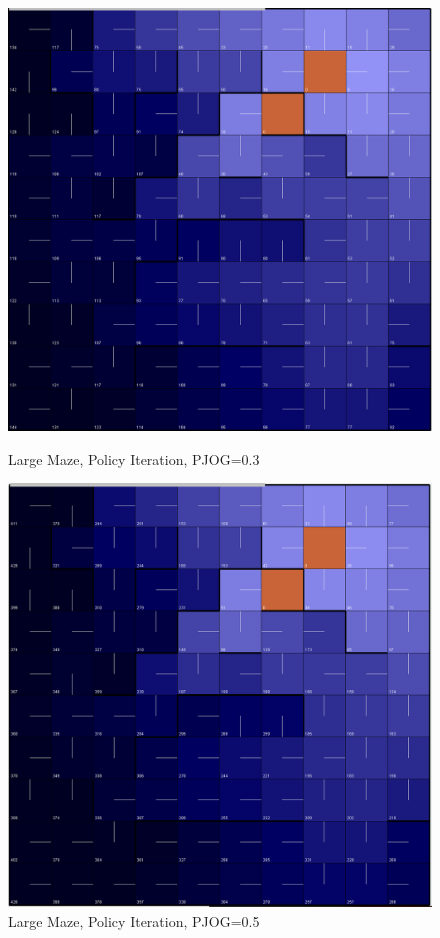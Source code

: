 \documentclass[11pt]{article}
\begin{document}
\begin{figure}[!htb]
   \begin{minipage}{0.4\textwidth}
     \centering
     \includegraphics[width=1.2\linewidth]{../figures/policy2_3.png}
     \caption{Large Maze, Policy Iteration, PJOG=0.3}\label{Fig:policy2_3}
   \end{minipage}\hfill
   \begin{minipage}{0.4\textwidth}
     \centering
     \includegraphics[width=1.2\linewidth]{../figures/policy2_5.png}
     \caption{Large Maze, Policy Iteration, PJOG=0.5}\label{Fig:policy2_5}
   \end{minipage}
\end{figure}
\end{document}
